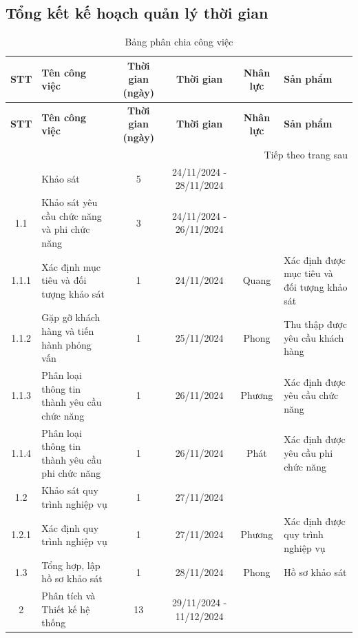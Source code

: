 \subsection{Tổng kết kế hoạch quản lý thời gian}
\clearpage
\begin{longtable}{|c|p{3cm}|c|c|c|p{2.8cm}|}
    \caption{Bảng phân chia công việc} \\ \hline
    \textbf{STT} & \textbf{Tên công việc} & \textbf{Thời gian (ngày)} & \textbf{Thời gian} & \textbf{Nhân lực} & \textbf{Sản phẩm} \\ \hline
    \endfirsthead
    \hline
    \textbf{STT} & \textbf{Tên công việc} & \textbf{Thời gian (ngày)} & \textbf{Thời gian} & \textbf{Nhân lực} & \textbf{Sản phẩm} \\ \hline
    \endhead
    \hline \multicolumn{6}{|r|}{{Tiếp theo trang sau}} \\ \hline
    \endfoot
    \hline
    \endlastfoot
    1 & Khảo sát & 5 & 24/11/2024 - 28/11/2024 & \hspace{0pt} & \hspace{0pt}\\ \hline
    1.1 & Khảo sát yêu cầu chức năng và phi chức năng & 3 & 24/11/2024 - 26/11/2024 & \hspace{0pt} & \hspace{0pt} \\ \hline
    1.1.1 & Xác định mục tiêu và đối tượng khảo sát & 1 & 24/11/2024 & Quang & Xác định được mục tiêu và đối tượng khảo sát \\ \hline
    1.1.2 & Gặp gỡ khách hàng và tiến hành phỏng vấn & 1 & 25/11/2024 & Phong & Thu thập được yêu cầu khách hàng \\ \hline
    1.1.3 & Phân loại thông tin thành yêu cầu chức năng & 1 & 26/11/2024 & Phương & Xác định được yêu cầu chức năng \\ \hline
    1.1.4 & Phân loại thông tin thành yêu cầu phi chức năng & 1 & 26/11/2024 & Phát & Xác định được yêu cầu phi chức năng \\ \hline
    1.2 & Khảo sát quy trình nghiệp vụ & 1 & 27/11/2024 & \hspace{0pt} & \hspace{0pt} \\ \hline
    1.2.1 & Xác định quy trình nghiệp vụ & 1 & 27/11/2024 & Phương & Xác định được quy trình nghiệp vụ \\ \hline
    1.3 & Tổng hợp, lập hồ sơ khảo sát & 1 & 28/11/2024 & Phong & Hồ sơ khảo sát \\ \hline
    2 & Phân tích và Thiết kế hệ thống & 13 & 29/11/2024 - 11/12/2024 & \hspace{0pt} & \hspace{0pt}\\ \hline

\end{longtable}

